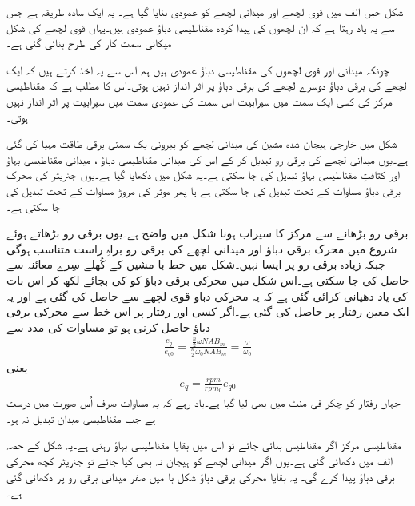 شکل  حسِ الف میں قوی لچھے اور میدانی لچھے کو عمودی بنایا گیا ہے۔ یہ ایک سادہ طریقہ ہے جس سے یہ یاد رہتا ہے کہ ان لچھوں کی پیدا کردہ مقناطیسی دباؤ عمودی ہیں۔یہاں قوی لچھے کی شکل میکانی سمت کار کی طرح بنائی گئی ہے۔

چونکہ میدانی اور قوی لچھوں کی مقناطیسی دباؤ عمودی ہیں ہم اس سے یہ اخذ کرتے ہیں کہ ایک لچھے کی برقی دباؤ دوسرے لچھے کی برقی دباؤ پر اثر انداز نہیں ہوتی۔اس کا مطلب ہے کہ مقناطیسی مرکز کی کسی ایک سمت میں  سیرابیت اس سمت کی عمودی سمت میں سیرابیت پر اثر انداز نہیں ہوتی۔

شکل میں خارجی ہیجان شدہ مشین کی میدانی لچھے کو بیرونی یک سمتی برقی طاقت مہیا کی گئی ہے۔یوں میدانی لچھے کی برقی رو تبدیل کر کے اس کی میدانی مقناطیسی دباؤ  ، میدانی مقناطیسی بہاؤ   اور کثافتِ مقناطیسی بہاؤ   تبدیل کی جا سکتی ہے۔یہ شکل میں دکھایا گیا ہے۔یوں جنریٹر کی محرک برقی دباؤ مساوات  کے تحت تبدیل کی جا سکتی ہے یا پھر موٹر کی مروڑ مساوات  کے تحت تبدیل کی جا سکتی ہے۔

برقی رو بڑھانے سے مرکز کا سیراب ہونا شکل  میں واضح ہے۔یوں برقی رو بڑھاتے ہوئے شروع میں محرک برقی دباؤ اور میدانی لچھے کی برقی رو براہِ راست متناسب ہوگی جبکہ زیادہ برقی رو پر ایسا نہیں۔شکل میں خط با  مشین کے کُھلے سِرے معائنہ سے حاصل کی جا سکتی ہے۔اس شکل میں محرکی برقی دباؤ کو  کی بجائے   لکھ کر اس بات کی یاد دھیانی کرائی گئی ہے کہ یہ محرکی دباو  قوی لچھے سے حاصل کی گئی ہے اور یہ ایک معین رفتار  پر حاصل کی گئی ہے۔اگر کسی اور رفتار  پر اس خط سے محرکی برقی دباؤ  حاصل کرنی ہو تو مساوات  کی مدد سے
\begin{align}
\frac{e_q}{e_{q0}}=\frac{\frac{n}{2} \omega N A B_m}{\frac{n}{2} \omega_0 N A B_m}=\frac{\omega}{\omega_0}
\end{align}
یعنی
\begin{align}
e_q=\frac{rpm}{rpm_0} e_{q0}
\end{align}
جہاں رفتار کو چکر فی منٹ میں بھی لیا گیا ہے۔یاد رہے کہ یہ مساوات صرف اُس صورت میں درست ہے جب مقناطیسی میدان تبدیل نہ ہو۔

مقناطیسی مرکز اگر مقناطیس بنائی جائے تو اس میں بقایا مقناطیسی بہاؤ رہتی ہے۔یہ شکل کے حصہ الف میں دکھائی گئی ہے۔یوں اگر میدانی لچھے کو ہیجان نہ بھی کیا جائے تو جنریٹر کچھ محرکی برقی دباؤ پیدا کرے گی۔ یہ بقایا  محرکی برقی دباؤ شکل با میں صفر میدانی برقی رو پر دکھائی گئی ہے۔

